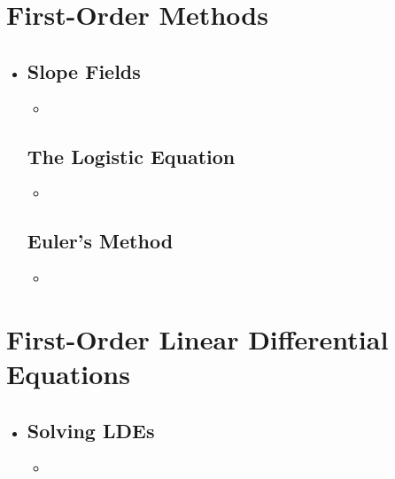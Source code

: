 \section{First-Order Methods}
\begin{itemize}
  \item []

  \subsection{Slope Fields}
  \begin{itemize}
    \item
  \end{itemize}

  \subsection{The Logistic Equation}
  \begin{itemize}
    \item
  \end{itemize}



  \subsection{Euler's Method}
  \begin{itemize}
    \item
  \end{itemize}

\end{itemize}



\section{First-Order Linear Differential Equations}
\begin{itemize}
  \item []

  \subsection{Solving LDEs}
  \begin{itemize}
    \item
  \end{itemize}


\end{itemize}


